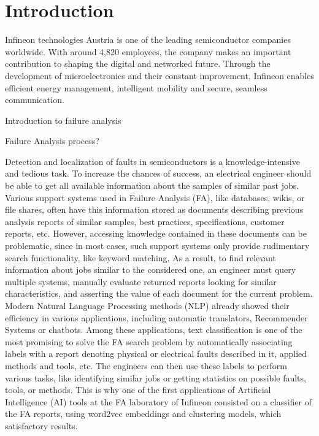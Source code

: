 \chapter{Introduction} \label{chapter:introduction}

Infineon technologies Austria is one of the leading semiconductor companies worldwide. With around 4,820 employees, the company makes an important contribution to shaping the digital and networked future. Through the development of microelectronics and their constant improvement, Infineon enables efficient energy management, intelligent mobility and secure, seamless communication. \newline

Introduction to failure analysis

Failure Analysis process?


Detection and localization of faults in semiconductors is a knowledge-intensive and tedious task. To increase the chances of success, an electrical engineer should be able to get all available information about the samples of similar past jobs. Various support systems used in Failure Analysis (FA), like databases, wikis, or file shares, often have this information stored as documents describing previous analysis reports of similar samples, best practices, specifications, customer reports, etc. However, accessing knowledge contained in these documents can be problematic, since in most cases, such support systems only provide rudimentary search functionality, like keyword matching. As a result, to find relevant information about jobs similar to the considered one, an engineer must query multiple systems, manually evaluate returned reports looking for similar characteristics, and asserting the value of each document for the current problem. \newline
Modern Natural Language Processing methods (NLP) already showed their efficiency in various applications, including automatic translators, Recommender Systems or chatbots. Among these applications, text classification is one of the most promising to solve the FA search problem by automatically associating labels with a report denoting physical or electrical faults described in it, applied methods and tools, etc. The engineers can then use these labels to perform various tasks, like identifying similar jobs or getting statistics on possible faults, tools, or methods. \newline
This is why one of the first applications of Artificial Intelligence (AI) tools at the FA laboratory of Infineon consisted on a classifier of the FA reports, using word2vec embeddings and clustering models, which satisfactory results. \newline

